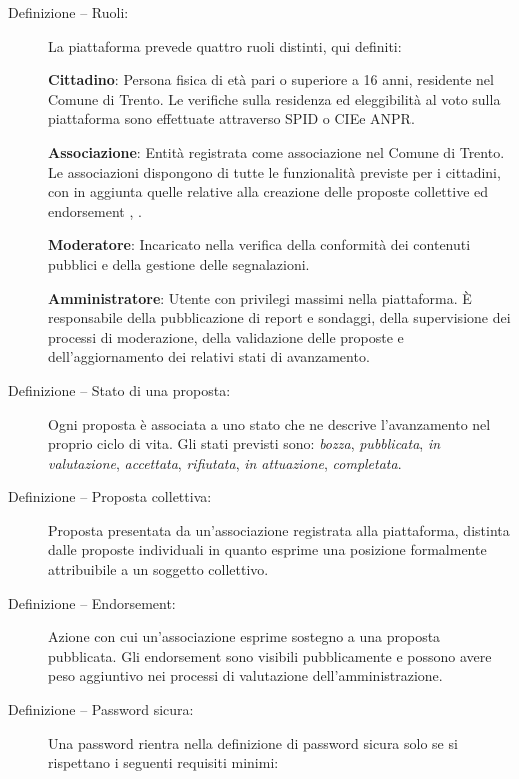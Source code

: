 \begin{description}
\item[Definizione \thedefinition\label{def:ruoli} – Ruoli:]
La piattaforma prevede quattro ruoli distinti, qui definiti: 

\textbf{Cittadino}:
Persona fisica di età pari o superiore a 16 anni, residente nel Comune di Trento.  
Le verifiche sulla residenza ed eleggibilità al voto sulla piattaforma sono effettuate attraverso SPID o CIE\@ e ANPR\@.

\textbf{Associazione}:
Entità registrata come associazione nel Comune di Trento.
Le associazioni dispongono di tutte le funzionalità previste per i cittadini, con in aggiunta quelle relative alla creazione delle proposte collettive ed endorsement , .

\textbf{Moderatore}:
Incaricato nella verifica della conformità dei contenuti pubblici e della gestione delle segnalazioni.

\textbf{Amministratore}:
Utente con privilegi massimi nella piattaforma.
È responsabile della pubblicazione di report e sondaggi, della supervisione dei processi di moderazione, della validazione delle proposte e dell'aggiornamento dei relativi stati di avanzamento.

\item[Definizione \thedefinition\label{def:statoproposta} – Stato di una proposta:]
Ogni proposta è associata a uno stato che ne descrive l’avanzamento nel proprio ciclo di vita.
Gli stati previsti sono: \emph{bozza}, \emph{pubblicata}, \emph{in valutazione}, \emph{accettata}, \emph{rifiutata}, \emph{in attuazione}, \emph{completata}.

\item[Definizione \thedefinition\label{def:propostacollettiva} – Proposta collettiva:]
Proposta presentata da un’associazione registrata alla piattaforma, distinta dalle proposte individuali in quanto esprime una posizione formalmente attribuibile a un soggetto collettivo.

\item[Definizione \thedefinition\label{def:endorsement} – Endorsement:]
Azione con cui un’associazione esprime sostegno a una proposta pubblicata. Gli endorsement sono visibili pubblicamente e possono avere peso aggiuntivo nei processi di valutazione dell'amministrazione.

\item[Definizione \thedefinition\label{def:credenziali} – Password sicura:]
Una password rientra nella definizione di password sicura solo se si rispettano i seguenti requisiti minimi:


\end{description}

